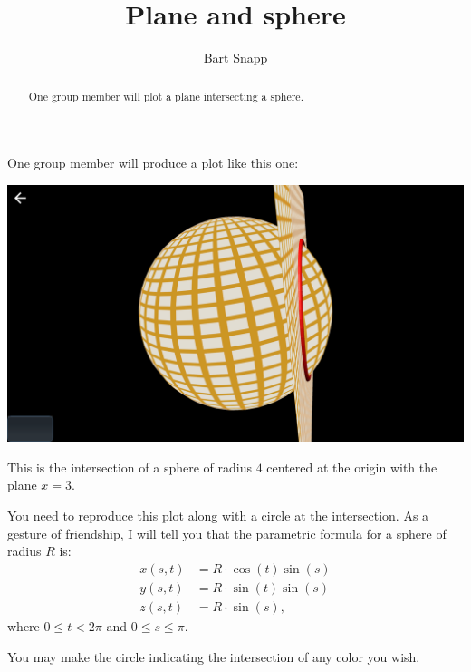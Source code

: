 \documentclass{ximera}
\author{Bart Snapp}
\title{Plane and sphere}
\begin{document}
\begin{abstract}
  One group member will plot a plane intersecting a sphere.
\end{abstract}
\maketitle

One group member will produce a plot like this one:
\begin{image}
  \includegraphics{planeAndSphere.png}
\end{image}

This is the intersection of a sphere of radius $4$ centered at the origin with the plane $x=3$.

You need to reproduce this plot along with a circle at the
intersection.
As a gesture of friendship, I will tell you that the parametric
formula for a sphere of radius $R$ is:
\begin{align*}
  x(s,t) &= R\cdot \cos(t)\sin(s)\\
  y(s,t) &= R\cdot \sin(t)\sin(s)\\
  z(s,t) &= R\cdot \sin(s),
\end{align*}
where $0\le t< 2\pi$ and $0\le s \le \pi$.

You may make the circle indicating the intersection of any color you
wish.
\end{document}
